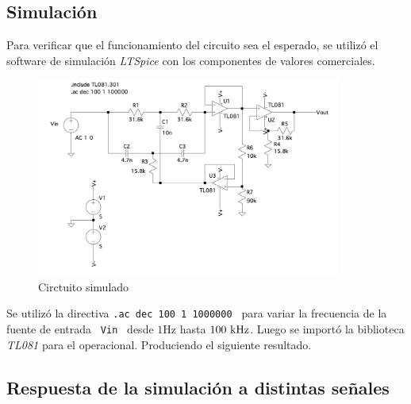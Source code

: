 
\subsection*{Simulaci\'on}
	Para verificar que el funcionamiento del circuito sea el esperado, se utiliz\'o el software de simulaci\'on \textit{LTSpice} con los componentes de valores comerciales. 
\begin{figure}[hbt]
	\centering
	\includegraphics[width=10cm]{imagenes/simulacion}
	\caption{Circtuito simulado}
\end{figure}

	
Se utiliz\'o la directiva \texttt{.ac dec 100 1 1000000 } para
variar la  frecuencia de la fuente de entrada \texttt{ Vin } desde  $1 \si{\hertz}$ hasta $100 \ \si{\kilo\hertz}$. Luego se import\'o la biblioteca \textit{TL081} para el operacional. Produciendo el siguiente resultado.


\subsection*{Respuesta de la simulaci\'on a distintas señales}


